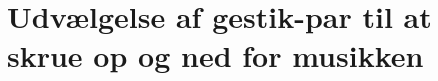 \section{Udvælgelse af gestik-par til at skrue op og ned for musikken}
\label{TestresultaterVolumen}
%